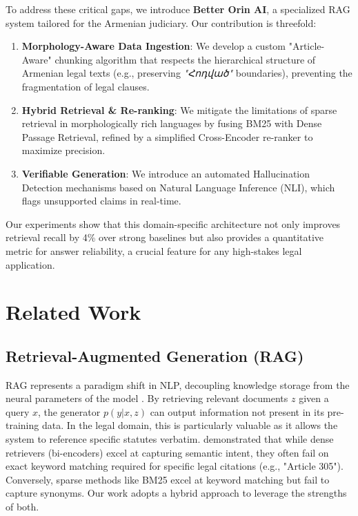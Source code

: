 \documentclass[11pt]{article}
\begin{document}
To address these critical gaps, we introduce \textbf{Better Orin AI}, a specialized RAG system tailored for the Armenian judiciary. Our contribution is threefold:
\begin{enumerate}
    \item \textbf{Morphology-Aware Data Ingestion}: We develop a custom "Article-Aware" chunking algorithm that respects the hierarchical structure of Armenian legal texts (e.g., preserving \textit{"Հոդված"} boundaries), preventing the fragmentation of legal clauses.
    \item \textbf{Hybrid Retrieval \& Re-ranking}: We mitigate the limitations of sparse retrieval in morphologically rich languages by fusing BM25 with Dense Passage Retrieval, refined by a simplified Cross-Encoder re-ranker to maximize precision.
    \item \textbf{Verifiable Generation}: We introduce an automated Hallucination Detection mechanisms based on Natural Language Inference (NLI), which flags unsupported claims in real-time.
\end{enumerate}

Our experiments show that this domain-specific architecture not only improves retrieval recall by 4\% over strong baselines but also provides a quantitative metric for answer reliability, a crucial feature for any high-stakes legal application.

\section{Related Work}

\subsection{Retrieval-Augmented Generation (RAG)}
RAG represents a paradigm shift in NLP, decoupling knowledge storage from the neural parameters of the model \citep{guu2020realm}. By retrieving relevant documents $z$ given a query $x$, the generator $p(y|x, z)$ can output information not present in its pre-training data. In the legal domain, this is particularly valuable as it allows the system to reference specific statutes verbatim. \citet{thakur2021beir} demonstrated that while dense retrievers (bi-encoders) excel at capturing semantic intent, they often fail on exact keyword matching required for specific legal citations (e.g., "Article 305"). Conversely, sparse methods like BM25 excel at keyword matching but fail to capture synonyms. Our work adopts a hybrid approach \citep{karpukhin2020dense} to leverage the strengths of both.
\end{document}
